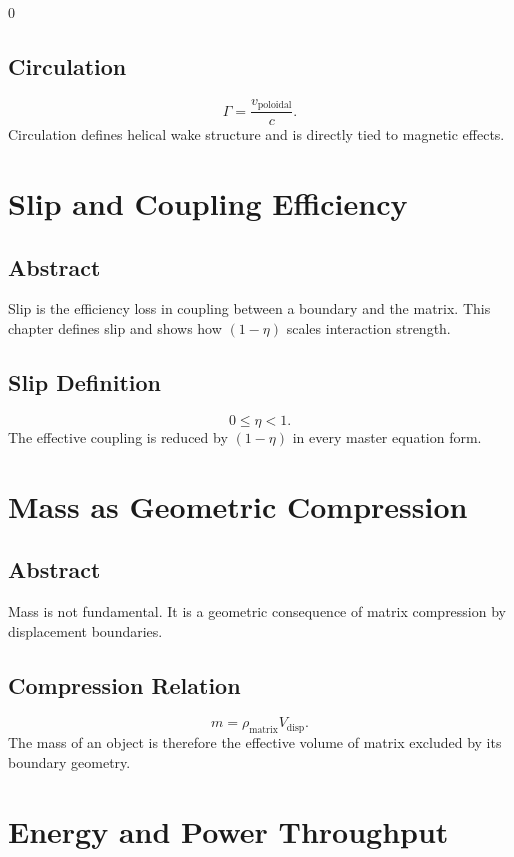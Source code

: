 0\documentclass[12pt]{book}
\begin{document}
\section{Circulation}
\begin{equation}
\Gamma = \frac{v_{\text{poloidal}}}{c}.
\end{equation}
Circulation defines helical wake structure and is directly tied to magnetic effects.

\chapter{Slip and Coupling Efficiency}

\section*{Abstract}
Slip is the efficiency loss in coupling between a boundary and the matrix. This chapter defines slip and
shows how $(1-\eta)$ scales interaction strength.

\section{Slip Definition}
\begin{equation}
0 \le \eta < 1.
\end{equation}
The effective coupling is reduced by $(1-\eta)$ in every master equation form.

\chapter{Mass as Geometric Compression}

\section*{Abstract}
Mass is not fundamental. It is a geometric consequence of matrix compression by displacement boundaries.

\section{Compression Relation}
\begin{equation}
m = \rho_{\text{matrix}} V_{\text{disp}}.
\end{equation}
The mass of an object is therefore the effective volume of matrix excluded by its boundary geometry.

\chapter{Energy and Power Throughput}
\end{document}

